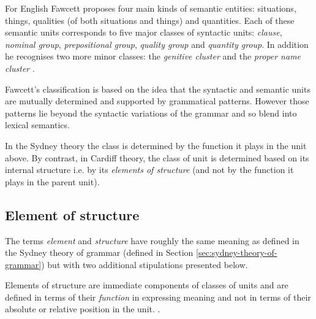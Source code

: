     For English Fawcett proposes four main kinds of semantic entities: situations, things, qualities (of both situations and things) and quantities. Each of these semantic units corresponds to five major classes of syntactic units: \textit{clause}, \textit{nominal group}, \textit{prepositional group}, \textit{quality group} and \textit{quantity group}. In addition he recognises two more minor classes: the \textit{genitive cluster} and the \textit{proper name cluster} \citep[193--194]{Fawcett2000}. 
    
    
    Fawcett's classification is based on the idea that the syntactic and semantic units are mutually determined and supported by grammatical patterns. However those patterns lie beyond the syntactic variations of the grammar and so blend into lexical semantics.
    
    In the Sydney theory the class is determined by the function it plays in the unit above. By contrast, in Cardiff theory, the class of unit is determined based on its internal structure i.e. by its \textit{elements of structure} (and not by the function it plays in the parent unit).  

\subsection{Element of structure}
\label{sec:elements-of-structure}
    
    The terms \textit{element} and \textit{structure} have roughly the same meaning as defined in the Sydney theory of grammar (defined in Section \ref{sec:sydney-theory-of-grammar}) but with two additional stipulations presented below.
    
    \begin{definition}\label{def:elementStructure}
    	Elements of structure are immediate components of classes of units and are defined in terms of their \textit{function} in expressing meaning and not in terms of their absolute or relative position in the unit. \citep[213--214]{Fawcett2000}. 
    \end{definition}
    
